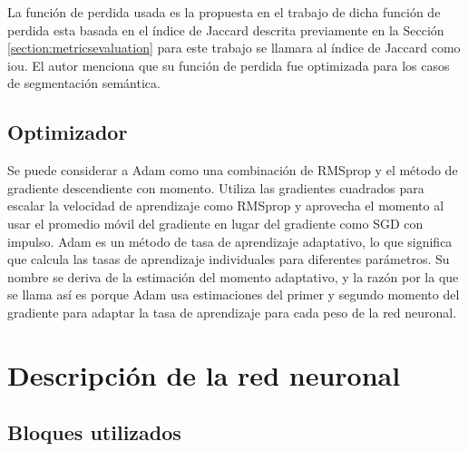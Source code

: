  La función de perdida usada es la propuesta en el trabajo de \cite{Berman2017} dicha función de perdida  esta basada en el índice de Jaccard descrita previamente en la Sección \ref{section:metricsevaluation} para este trabajo se llamara al índice de Jaccard como \gls{iou}. El autor menciona que su función de perdida fue optimizada para los casos de segmentación semántica.





\subsection{Optimizador}

Se puede considerar a Adam \cite {kingma2014adam}como una combinación de RMSprop y el método de gradiente descendiente con momento. Utiliza las gradientes cuadrados para escalar la velocidad de aprendizaje como RMSprop y aprovecha el momento al usar el promedio móvil del gradiente en lugar del gradiente como SGD con impulso. Adam es un método de tasa de aprendizaje adaptativo, lo que significa que calcula las tasas de aprendizaje individuales para diferentes parámetros. Su nombre se deriva de la estimación del momento adaptativo, y la razón por la que se llama así es porque Adam usa estimaciones del primer y segundo momento del gradiente para adaptar la tasa de aprendizaje para cada peso de la red neuronal.


\section{Descripción de la red neuronal}

\subsection{Bloques utilizados }
